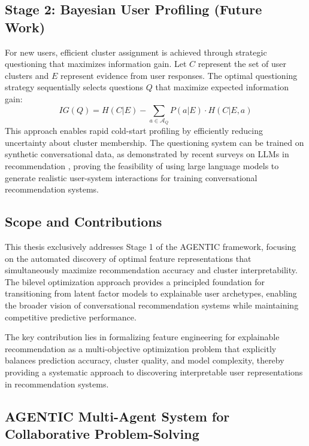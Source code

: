 \subsection*{Stage 2: Bayesian User Profiling (Future Work)}
For new users, efficient cluster assignment is achieved through strategic questioning that maximizes information gain. Let $C$ represent the set of user clusters and $E$ represent evidence from user responses. The optimal questioning strategy sequentially selects questions $Q$ that maximize expected information gain:
\[
    IG(Q) = H(C|E) - \sum_{a \in \mathcal{A}_Q} P(a|E) \cdot H(C|E,a)
\]
This approach enables rapid cold-start profiling by efficiently reducing uncertainty about cluster membership. The questioning system can be trained on synthetic conversational data, as demonstrated by recent surveys on LLMs in recommendation \cite{wu2023survey}, proving the feasibility of using large language models to generate realistic user-system interactions for training conversational recommendation systems.

\subsection*{Scope and Contributions}
This thesis exclusively addresses Stage 1 of the AGENTIC framework, focusing on the automated discovery of optimal feature representations that simultaneously maximize recommendation accuracy and cluster interpretability. The bilevel optimization approach provides a principled foundation for transitioning from latent factor models to explainable user archetypes, enabling the broader vision of conversational recommendation systems while maintaining competitive predictive performance.

The key contribution lies in formalizing feature engineering for explainable recommendation as a multi-objective optimization problem that explicitly balances prediction accuracy, cluster quality, and model complexity, thereby providing a systematic approach to discovering interpretable user representations in recommendation systems.






\subsection{AGENTIC Multi-Agent System for Collaborative Problem-Solving}

